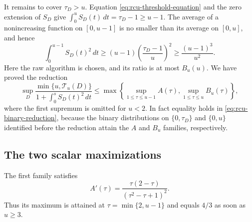 It remains to cover $\tau_D>u$.  Equation
\eqref{eq:rcu-threshold-equation} and the zero extension of $S_D$ give
$\int_0^uS_D(t)\,dt=\tau_D-1\ge u-1$.  The average of a nonincreasing function on
$[0,u-1]$ is no smaller than its average on $[0,u]$, and hence
\begin{equation}
 \int_0^{u-1}S_D(t)^2\,dt
 \ge (u-1)\left(\frac{\tau_D-1}{u}\right)^2
 \ge\frac{(u-1)^3}{u^2}.
 \label{eq:rcu-tau-large}
\end{equation}
Here the raw algorithm is chosen, and its ratio is at most $B_u(u)$.
We have proved the reduction
\begin{equation}
 \sup_D\frac{\min\{u,\mathcal T_u(D)\}}
                 {1+\int_0^sS_D(t)^2\,dt}
 \le
 \max\left\{
  \sup_{1\le\tau\le u-1}A(\tau),
  \sup_{1\le\tau\le u}B_u(\tau)
 \right\},
 \label{eq:rcu-binary-reduction}
\end{equation}
where the first supremum is omitted for $u<2$.  In fact equality holds in
\eqref{eq:rcu-binary-reduction}, because the binary distributions on
$\{0,\tau_D\}$ and $\{0,u\}$ identified before the reduction attain the
$A$ and $B_u$ families, respectively.

\subsection{The two scalar maximizations}

The first family satisfies
\begin{equation}
 A'(\tau)=\frac{\tau(2-\tau)}{(\tau^2-\tau+1)^2}.
 \label{eq:rcu-A-derivative}
\end{equation}
Thus its maximum is attained at $\tau=\min\{2,u-1\}$ and equals $4/3$ as
soon as $u\ge3$.

